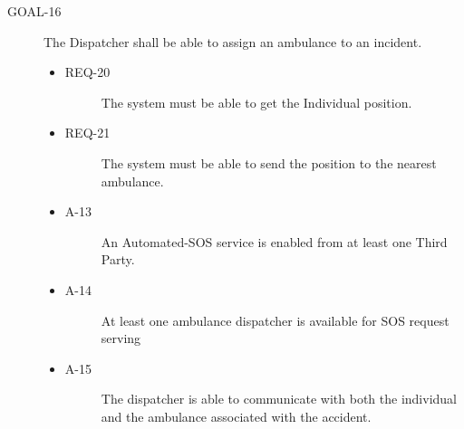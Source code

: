 \documentclass[a4paper]{article}
\newcommand{\requirement}{\ding{229}}%
\begin{document}
         \begin{description}
        	\item[GOAL-16] The Dispatcher shall be able to assign an ambulance to an incident.
            	\begin{itemize}
            	    \item[\requirement]
                	\begin{description}
                	\item[REQ-20] The system must be able to get the Individual position.
                	\end{description}
                	\item[\requirement]
                	\begin{description}
                	\item[REQ-21] The system must be able to send the position to the nearest ambulance.
                	\end{description}
                	\item
                	\begin{description}
                	\item[A-13] An Automated-SOS service is enabled from at least one Third Party.
                	\end{description}
                	\item
                	\begin{description}
                	\item[A-14] At least one ambulance dispatcher is available for SOS request serving \end{description}
                	\item
                	\begin{description}
                	\item[A-15] The dispatcher is able to communicate with both the individual and the ambulance associated with the accident.
                	\end{description}
                	\end{itemize}
        \end{description}
        
\end{document}
